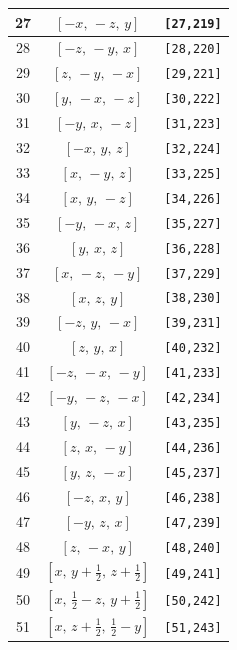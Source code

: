 \documentclass[fleqn,8pt]{jsarticle}
\begin{document}
\begin{longtable}{ccc}
27 & $\left[ - x,\, - z,\, y \right]$ & {\tt [27,219]} \\ \hline
28 & $\left[ - z,\, - y,\, x \right]$ & {\tt [28,220]} \\ \hline
29 & $\left[ z,\, - y,\, - x \right]$ & {\tt [29,221]} \\ \hline
30 & $\left[ y,\, - x,\, - z \right]$ & {\tt [30,222]} \\ \hline
31 & $\left[ - y,\, x,\, - z \right]$ & {\tt [31,223]} \\ \hline
32 & $\left[ - x,\, y,\, z \right]$ & {\tt [32,224]} \\ \hline
33 & $\left[ x,\, - y,\, z \right]$ & {\tt [33,225]} \\ \hline
34 & $\left[ x,\, y,\, - z \right]$ & {\tt [34,226]} \\ \hline
35 & $\left[ - y,\, - x,\, z \right]$ & {\tt [35,227]} \\ \hline
36 & $\left[ y,\, x,\, z \right]$ & {\tt [36,228]} \\ \hline
37 & $\left[ x,\, - z,\, - y \right]$ & {\tt [37,229]} \\ \hline
38 & $\left[ x,\, z,\, y \right]$ & {\tt [38,230]} \\ \hline
39 & $\left[ - z,\, y,\, - x \right]$ & {\tt [39,231]} \\ \hline
40 & $\left[ z,\, y,\, x \right]$ & {\tt [40,232]} \\ \hline
41 & $\left[ - z,\, - x,\, - y \right]$ & {\tt [41,233]} \\ \hline
42 & $\left[ - y,\, - z,\, - x \right]$ & {\tt [42,234]} \\ \hline
43 & $\left[ y,\, - z,\, x \right]$ & {\tt [43,235]} \\ \hline
44 & $\left[ z,\, x,\, - y \right]$ & {\tt [44,236]} \\ \hline
45 & $\left[ y,\, z,\, - x \right]$ & {\tt [45,237]} \\ \hline
46 & $\left[ - z,\, x,\, y \right]$ & {\tt [46,238]} \\ \hline
47 & $\left[ - y,\, z,\, x \right]$ & {\tt [47,239]} \\ \hline
48 & $\left[ z,\, - x,\, y \right]$ & {\tt [48,240]} \\ \hline
49 & $\left[ x,\, y + \frac{1}{2},\, z + \frac{1}{2} \right]$ & {\tt [49,241]} \\ \hline
50 & $\left[ x,\, \frac{1}{2} - z,\, y + \frac{1}{2} \right]$ & {\tt [50,242]} \\ \hline
51 & $\left[ x,\, z + \frac{1}{2},\, \frac{1}{2} - y \right]$ & {\tt [51,243]} \\ \hline

\end{longtable}
\end{document}
